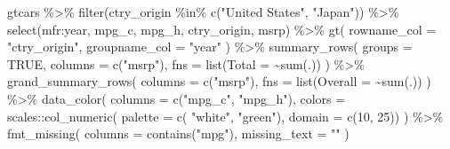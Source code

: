 \documentclass[
]{book}
\newenvironment{Shaded}{\begin{snugshade}}{\end{snugshade}}
\newcommand{\AttributeTok}[1]{\textcolor[rgb]{0.77,0.63,0.00}{#1}}
\newcommand{\ConstantTok}[1]{\textcolor[rgb]{0.00,0.00,0.00}{#1}}
\newcommand{\DecValTok}[1]{\textcolor[rgb]{0.00,0.00,0.81}{#1}}
\newcommand{\FunctionTok}[1]{\textcolor[rgb]{0.00,0.00,0.00}{#1}}
\newcommand{\NormalTok}[1]{#1}
\newcommand{\SpecialCharTok}[1]{\textcolor[rgb]{0.00,0.00,0.00}{#1}}
\newcommand{\StringTok}[1]{\textcolor[rgb]{0.31,0.60,0.02}{#1}}
\begin{document}
\begin{Shaded}
\begin{Highlighting}[]
\NormalTok{gtcars }\SpecialCharTok{\%\textgreater{}\%}
    \FunctionTok{filter}\NormalTok{(ctry\_origin }\SpecialCharTok{\%in\%} \FunctionTok{c}\NormalTok{(}\StringTok{"United States"}\NormalTok{, }\StringTok{"Japan"}\NormalTok{)) }\SpecialCharTok{\%\textgreater{}\%}
    \FunctionTok{select}\NormalTok{(mfr}\SpecialCharTok{:}\NormalTok{year, mpg\_c, mpg\_h, ctry\_origin, msrp) }\SpecialCharTok{\%\textgreater{}\%} 
    \FunctionTok{gt}\NormalTok{(}
        \AttributeTok{rowname\_col =} \StringTok{"ctry\_origin"}\NormalTok{,}
        \AttributeTok{groupname\_col =} \StringTok{"year"}
\NormalTok{    ) }\SpecialCharTok{\%\textgreater{}\%}
    \FunctionTok{summary\_rows}\NormalTok{(}
        \AttributeTok{groups =} \ConstantTok{TRUE}\NormalTok{,}
        \AttributeTok{columns =} \FunctionTok{c}\NormalTok{(}\StringTok{"msrp"}\NormalTok{),}
        \AttributeTok{fns =} \FunctionTok{list}\NormalTok{(}\AttributeTok{Total =} \SpecialCharTok{\textasciitilde{}}\FunctionTok{sum}\NormalTok{(.))}
\NormalTok{    ) }\SpecialCharTok{\%\textgreater{}\%}
    \FunctionTok{grand\_summary\_rows}\NormalTok{(}
        \AttributeTok{columns =} \FunctionTok{c}\NormalTok{(}\StringTok{"msrp"}\NormalTok{),}
        \AttributeTok{fns =} \FunctionTok{list}\NormalTok{(}\AttributeTok{Overall =} \SpecialCharTok{\textasciitilde{}}\FunctionTok{sum}\NormalTok{(.))}
\NormalTok{    ) }\SpecialCharTok{\%\textgreater{}\%} 
  \FunctionTok{data\_color}\NormalTok{(}
    \AttributeTok{columns =} \FunctionTok{c}\NormalTok{(}\StringTok{"mpg\_c"}\NormalTok{, }\StringTok{"mpg\_h"}\NormalTok{),}
    \AttributeTok{colors =}\NormalTok{ scales}\SpecialCharTok{::}\FunctionTok{col\_numeric}\NormalTok{(}
      \AttributeTok{palette =} \FunctionTok{c}\NormalTok{(}
        \StringTok{"white"}\NormalTok{, }\StringTok{"green"}\NormalTok{),}
      \AttributeTok{domain =} \FunctionTok{c}\NormalTok{(}\DecValTok{10}\NormalTok{, }\DecValTok{25}\NormalTok{))}
\NormalTok{  ) }\SpecialCharTok{\%\textgreater{}\%} 
  \FunctionTok{fmt\_missing}\NormalTok{(}
        \AttributeTok{columns =} \FunctionTok{contains}\NormalTok{(}\StringTok{"mpg"}\NormalTok{),}
        \AttributeTok{missing\_text =} \StringTok{""}
\NormalTok{    )}
\end{Highlighting}
\end{Shaded}
\end{document}
